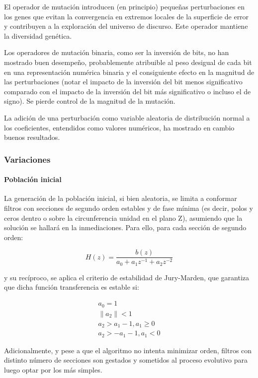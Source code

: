 \documentclass[11pt, journal]{IEEEtran}
\begin{document}
El operador de mutación introducen (en principio) pequeñas
perturbaciones en los genes que evitan la convergencia en extremos
locales de la superficie de error y contribuyen a la exploración del
universo de discurso. Este operador mantiene la diversidad genética.

Los operadores de mutación binaria, como ser la inversión de bits, no
han mostrado buen desempeño, probablemente atribuible al peso desigual
de cada bit en una representación numérica binaria y el consiguiente
efecto en la magnitud de las perturbaciones (notar el impacto de la
inversión del bit menos significativo comparado con el impacto de la
inversión del bit más significativo o incluso el de signo). Se pierde
control de la magnitud de la mutación.

La adición de una perturbación como variable aleatoria de distribución
normal a los coeficientes, entendidos como valores numéricos, ha
mostrado en cambio buenos resultados.

\subsubsection{Variaciones}

\paragraph{Población inicial}

La generación de la población inicial, si bien aleatoria, se limita a
conformar filtros con secciones de segundo orden estables y de fase
mínima (es decir, polos y ceros dentro o sobre la circunferencia unidad
en el plano Z), asumiendo que la solución se hallará en la
inmediaciones. Para ello, para cada sección de segundo orden:


\begin{equation}
H(z) = \frac{b(z)}{a_0 + a_1 z^{-1} + a_2 z^{-2}}
\end{equation}


y su recíproco, se aplica el criterio de estabilidad de Jury-Marden, que
garantiza que dicha función transferencia es estable si:


\begin{gather*}
a_0 = 1 \\
\|a_2\| < 1 \\
a_2 > a_1 - 1, a_1 \geq 0 \\
a_2 > -a_1 - 1, a_1 < 0
\end{gather*}


Adicionalmente, y pese a que el algoritmo no intenta minimizar orden,
filtros con distinto número de secciones son gestados y sometidos al
proceso evolutivo para luego optar por los más simples.
\end{document}

